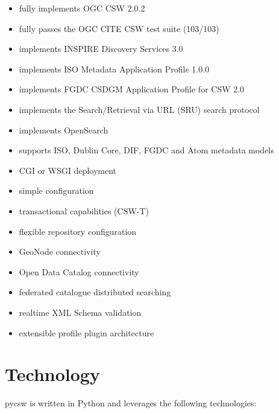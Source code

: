 \begin{itemize}
 \item fully implements OGC CSW 2.0.2
 \item fully passes the OGC CITE CSW test suite (103/103)
 \item implements INSPIRE Discovery Services 3.0
 \item implements ISO Metadata Application Profile 1.0.0
 \item implements FGDC CSDGM Application Profile for CSW 2.0
 \item implements the Search/Retrieval via URL (SRU) search protocol
 \item implements OpenSearch
 \item supports ISO, Dublin Core, DIF, FGDC and Atom metadata models
 \item CGI or WSGI deployment
 \item simple configuration
 \item transactional capabilities (CSW-T)
 \item flexible repository configuration
 \item GeoNode connectivity
 \item Open Data Catalog connectivity
 \item federated catalogue distributed searching
 \item realtime XML Schema validation
 \item extensible profile plugin architecture
\end{itemize}


\section{Technology}
\label{sec:technology}

pycsw is written in Python and leverages the following technologies:

